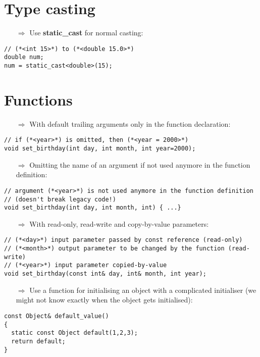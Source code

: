 \documentclass[10pt]{article}
\begin{document}
\section{Type casting}
\small
\begin{enumerate}
\item[$\Rightarrow$] Use \textbf{static\_cast} for normal casting:
\end{enumerate}
\begin{lstlisting}
// (*<int 15>*) to (*<double 15.0>*)
double num;
num = static_cast<double>(15);
\end{lstlisting}
%
%
\section{Functions}
\small
\begin{enumerate}
\item[$\Rightarrow$] With default trailing arguments only in the function declaration:
\end{enumerate}
\begin{lstlisting}
// if (*<year>*) is omitted, then (*<year = 2000>*)
void set_birthday(int day, int month, int year=2000);
\end{lstlisting}
\begin{enumerate}
\item[$\Rightarrow$] Omitting the name of an argument if not used anymore in the function definition:
\end{enumerate}
\begin{lstlisting}
// argument (*<year>*) is not used anymore in the function definition
// (doesn't break legacy code!)
void set_birthday(int day, int month, int) { ...}
\end{lstlisting}
\begin{enumerate}
\item[$\Rightarrow$] With read-only, read-write and copy-by-value parameters:
\end{enumerate}
\begin{lstlisting}
// (*<day>*) input parameter passed by const reference (read-only)
// (*<month>*) output parameter to be changed by the function (read-write)
// (*<year>*) input parameter copied-by-value
void set_birthday(const int& day, int& month, int year);
\end{lstlisting}
\begin{enumerate}
\item[$\Rightarrow$] Use a function for initialising an object with a complicated initialiser (we might not
know exactly when the object gets initialised):
\end{enumerate}
\begin{lstlisting}
const Object& default_value()
{
  static const Object default(1,2,3);
  return default;
}
\end{lstlisting}
\end{document}
